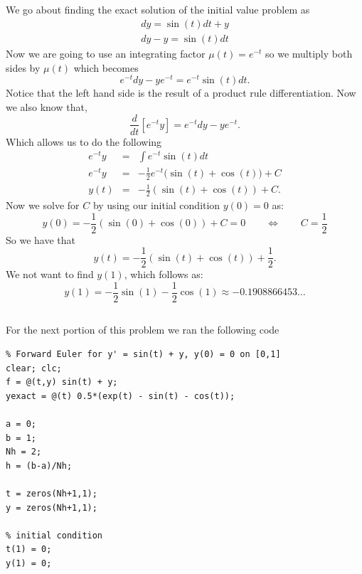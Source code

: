 \documentclass[12pt]{amsart}
\begin{document}
\begin{onehalfspace}
        \subsection{}
        We go about finding the exact solution of the initial value problem as
        \begin{gather*}
            dy = \sin(t)dt + y\\
            dy - y = \sin(t)dt
        \end{gather*}
        Now we are going to use an integrating factor $\mu(t) = e^{-t}$ so we multiply both sides by $\mu(t)$ which
        becomes
        \[
            e^{-t}dy - ye^{-t} = e^{-t}\sin(t)dt.
        \]
        Notice that the left hand side is the result of a product rule differentiation.
        Now we also know that,
        \[
            \frac{d}{dt}\left[e^{-t}y\right] = e^{-t}dy - ye^{-t}.
        \]
        Which allows us to do the following
        \begin{eqnarray*}
            e^{-t}y & = & \int e^{-t}\sin(t) dt\\
            e^{-t}y & = & -\frac{1}{2} e^{-t}\bigg(\sin(t) + \cos(t)\bigg) + C\\
            y(t) & = & -\frac{1}{2}(\sin(t)+\cos(t)) + C.
        \end{eqnarray*}
        Now we solve for $C$ by using our initial condition $y(0)=0$ as:
        \[
            y(0) = -\frac{1}{2}(\sin(0) + \cos(0)) + C = 0 \qquad\Longleftrightarrow\qquad C=\frac{1}{2}
        \]
        So we have that
        \[
            y(t) = -\frac{1}{2}(\sin(t)+\cos(t)) + \frac{1}{2}.
        \]
        We not want to find $y(1)$, which follows as:
        \[
            y(1) = -\frac{1}{2}\sin(1) - \frac{1}{2}\cos(1) \approx -0.1908866453\ldots
        \]

        \subsection{}
        For the next portion of this problem we ran the following code
        \begin{tiny}
        \begin{verbatim}
% Forward Euler for y' = sin(t) + y, y(0) = 0 on [0,1]
clear; clc;
f = @(t,y) sin(t) + y;
yexact = @(t) 0.5*(exp(t) - sin(t) - cos(t));

a = 0;
b = 1;
Nh = 2;
h = (b-a)/Nh;

t = zeros(Nh+1,1);
y = zeros(Nh+1,1);

% initial condition
t(1) = 0;
y(1) = 0;


\end{verbatim}
\end{tiny}
\end{onehalfspace}
\end{document}
